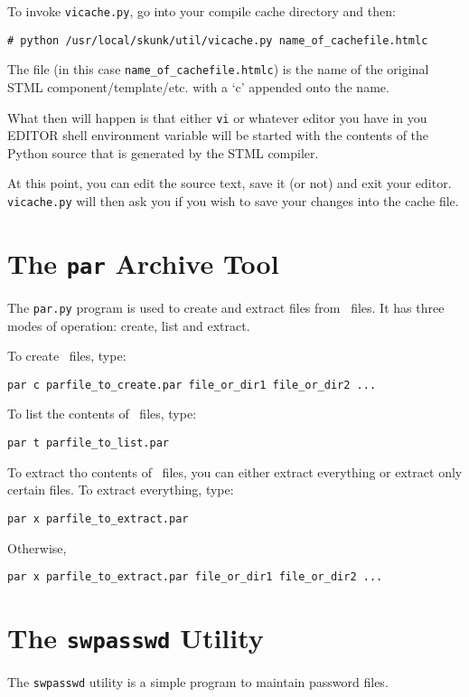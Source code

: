 \documentclass[titlepage]{manual}
\begin{document}
To invoke \texttt{vicache.py}, go into your compile cache directory
and then:
\begin{verbatim}
# python /usr/local/skunk/util/vicache.py name_of_cachefile.htmlc
\end{verbatim}
The file (in this case \texttt{name\_of\_cachefile.htmlc}) is the name
of the original STML component/template/etc. with a `c' appended onto
the name.  

What then will happen is that either \texttt{vi} or whatever editor you
have in you EDITOR shell environment variable will be started with the
contents of the Python source that is generated by the STML compiler.

At this point, you can edit the source text, save it (or not) and exit your
editor.  \texttt{vicache.py} will then ask you if you wish to save your
changes into the cache file.


\section{The \texttt{par} Archive Tool}
\label{pardotpy}
The \texttt{par.py} program is used to create and extract files from
\PAR\ files.  It has three modes of operation: create, list and
extract.

To create \PAR\ files, type:
\begin{verbatim}
par c parfile_to_create.par file_or_dir1 file_or_dir2 ...
\end{verbatim}

To list the contents of \PAR\ files, type:
\begin{verbatim}
par t parfile_to_list.par
\end{verbatim}

To extract tho contents of \PAR\ files, you can either extract
everything or extract only certain files.  To extract everything,
type:
\begin{verbatim}
par x parfile_to_extract.par
\end{verbatim}

Otherwise,
\begin{verbatim}
par x parfile_to_extract.par file_or_dir1 file_or_dir2 ...
\end{verbatim}


\section{The \texttt{swpasswd} Utility}
\label{swpasswd}
The \texttt{swpasswd} utility is a simple program to maintain
password files.  
\end{document}
